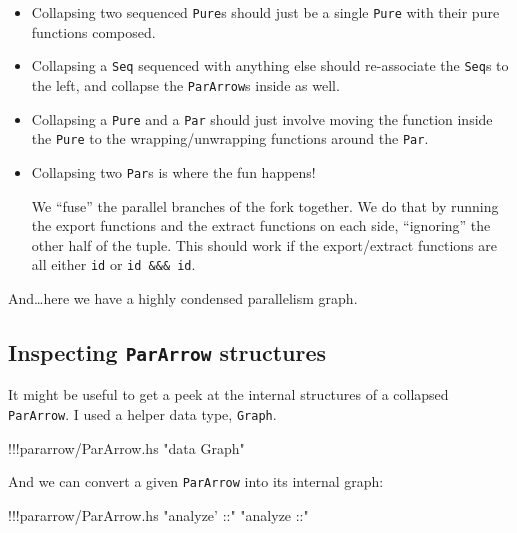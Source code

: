 \documentclass[]{article}
\newenvironment{Shaded}{}{}
\newcommand{\StringTok}[1]{\textcolor[rgb]{0.25,0.44,0.63}{{#1}}}
\newcommand{\FunctionTok}[1]{\textcolor[rgb]{0.02,0.16,0.49}{{#1}}}
\newcommand{\NormalTok}[1]{{#1}}
\begin{document}
\begin{itemize}
\item
  Collapsing two sequenced \texttt{Pure}s should just be a single
  \texttt{Pure} with their pure functions composed.
\item
  Collapsing a \texttt{Seq} sequenced with anything else should
  re-associate the \texttt{Seq}s to the left, and collapse the
  \texttt{ParArrow}s inside as well.
\item
  Collapsing a \texttt{Pure} and a \texttt{Par} should just involve
  moving the function inside the \texttt{Pure} to the
  wrapping/unwrapping functions around the \texttt{Par}.
\item
  Collapsing two \texttt{Par}s is where the fun happens!

  We ``fuse'' the parallel branches of the fork together. We do that by
  running the export functions and the extract functions on each side,
  ``ignoring'' the other half of the tuple. This should work if the
  export/extract functions are all either \texttt{id} or
  \texttt{id\ \&\&\&\ id}.
\end{itemize}

And\ldots{}here we have a highly condensed parallelism graph.

\subsection{\texorpdfstring{Inspecting \texttt{ParArrow}
structures}{Inspecting ParArrow structures}}\label{inspecting-pararrow-structures}

It might be useful to get a peek at the internal structures of a
collapsed \texttt{ParArrow}. I used a helper data type, \texttt{Graph}.

\begin{Shaded}
\begin{Highlighting}[]
\FunctionTok{!!!}\NormalTok{pararrow}\FunctionTok{/}\NormalTok{ParArrow.hs }\StringTok{"data Graph"}
\end{Highlighting}
\end{Shaded}

And we can convert a given \texttt{ParArrow} into its internal graph:

\begin{Shaded}
\begin{Highlighting}[]
\FunctionTok{!!!}\NormalTok{pararrow}\FunctionTok{/}\NormalTok{ParArrow.hs }\StringTok{"analyze' ::"} \StringTok{"analyze ::"}
\end{Highlighting}
\end{Shaded}
\end{document}
